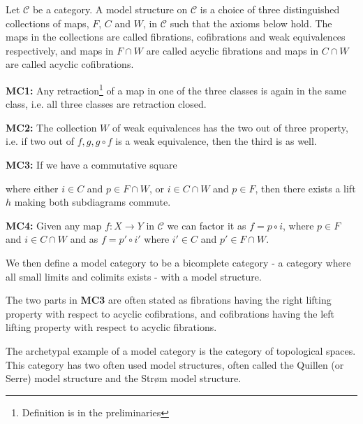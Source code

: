 \begin{definition}
Let $\mathcal{C}$ be a category. A model structure on $\mathcal{C}$ is a choice of three distinguished collections of maps, $F$, $C$ and $W$, in $\mathcal{C}$
such that the axioms below hold. The maps in the collections are called fibrations, cofibrations and weak equivalences respectively, and maps in $F\cap W$ are called acyclic fibrations and maps in $C\cap W$ are called acyclic cofibrations. 

\textbf{MC1:}
Any retraction\footnote{Definition is in the preliminaries} of a map in one of the three classes is again in the same class, i.e. all three classes are retraction closed. 

\textbf{MC2:}
The collection $W$ of weak equivalences has the two out of three property, i.e. if two out of $f, g, g\circ f$ is a weak equivalence, then the third is as well.

\textbf{MC3:}
If we have a commutative square 

\begin{center}
\end{center}

where either $i\in C$ and $p\in F\cap W$, or $i\in C\cap W$ and $p\in F$, then there exists a lift $h$ making both subdiagrams commute.

\textbf{MC4:}
Given any map $f:X\longrightarrow Y$ in $\mathcal{C}$ we can factor it as $f=p\circ i$, where $p\in F$ and $i\in C\cap W$ and as $f=p'\circ i'$ where $i'\in C$ and $p'\in F\cap W$. 
\end{definition}

We then define a model category to be a bicomplete category - a category where all small limits and colimits exists - with a model structure. 

The two parts in \textbf{MC3} are often stated as fibrations having the right lifting property with respect to acyclic cofibrations, and cofibrations having the left lifting property with respect to acyclic fibrations. 


The archetypal example of a model category is the category of topological spaces. This category has two often used model structures, often called the Quillen (or Serre) model structure and the Strøm model structure. 

